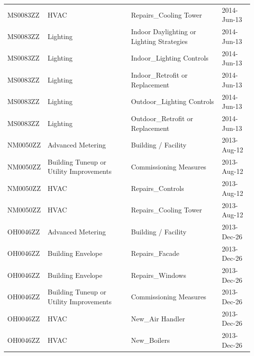 \documentclass[12pt]{article}
\begin{document}
\begin{longtable}{lp{4cm}p{4cm}p{3cm}}
MS0083ZZ         & HVAC                                    & Repairs\_Cooling Tower                    & 2014-Jun-13           \\
MS0083ZZ         & Lighting                                & Indoor Daylighting or Lighting Strategies & 2014-Jun-13           \\
MS0083ZZ         & Lighting                                & Indoor\_Lighting Controls                 & 2014-Jun-13           \\
MS0083ZZ         & Lighting                                & Indoor\_Retrofit or Replacement           & 2014-Jun-13           \\
MS0083ZZ         & Lighting                                & Outdoor\_Lighting Controls                & 2014-Jun-13           \\
MS0083ZZ         & Lighting                                & Outdoor\_Retrofit or Replacement          & 2014-Jun-13           \\
NM0050ZZ         & Advanced Metering                       & Building / Facility                       & 2013-Aug-12           \\
NM0050ZZ         & Building Tuneup or Utility Improvements & Commissioning Measures                    & 2013-Aug-12           \\
NM0050ZZ         & HVAC                                    & Repairs\_Controls                         & 2013-Aug-12           \\
NM0050ZZ         & HVAC                                    & Repairs\_Cooling Tower                    & 2013-Aug-12           \\
OH0046ZZ         & Advanced Metering                       & Building / Facility                       & 2013-Dec-26           \\
OH0046ZZ         & Building Envelope                       & Repairs\_Facade                           & 2013-Dec-26           \\
OH0046ZZ         & Building Envelope                       & Repairs\_Windows                          & 2013-Dec-26           \\
OH0046ZZ         & Building Tuneup or Utility Improvements & Commissioning Measures                    & 2013-Dec-26           \\
OH0046ZZ         & HVAC                                    & New\_Air Handler                          & 2013-Dec-26           \\
OH0046ZZ         & HVAC                                    & New\_Boilers                              & 2013-Dec-26           \\

\end{longtable}
\end{document}
